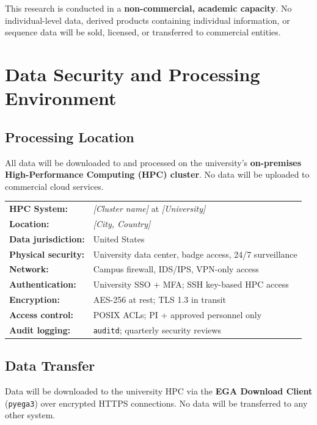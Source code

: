 \documentclass[11pt,a4paper]{article}
\begin{document}
This research is conducted in a \textbf{non-commercial, academic
capacity}. No individual-level data, derived products containing
individual information, or sequence data will be sold, licensed, or
transferred to commercial entities.

\section{Data Security and Processing Environment}

\subsection{Processing Location}

All data will be downloaded to and processed on the university's
\textbf{on-premises High-Performance Computing (HPC) cluster}. No data
will be uploaded to commercial cloud services.

\begin{tabular}{@{} l p{9cm} @{}}
\textbf{HPC System:} & \textit{[Cluster name]} at \textit{[University]} \\
\textbf{Location:} & \textit{[City, Country]} \\
\textbf{Data jurisdiction:} & United States \\
\textbf{Physical security:} & University data center, badge access, 24/7 surveillance \\
\textbf{Network:} & Campus firewall, IDS/IPS, VPN-only access \\
\textbf{Authentication:} & University SSO + MFA; SSH key-based HPC access \\
\textbf{Encryption:} & AES-256 at rest; TLS 1.3 in transit \\
\textbf{Access control:} & POSIX ACLs; PI + approved personnel only \\
\textbf{Audit logging:} & \texttt{auditd}; quarterly security reviews \\
\end{tabular}

\subsection{Data Transfer}

Data will be downloaded to the university HPC via the \textbf{EGA
Download Client} (\texttt{pyega3}) over encrypted HTTPS connections.
No data will be transferred to any other system.
\end{document}
